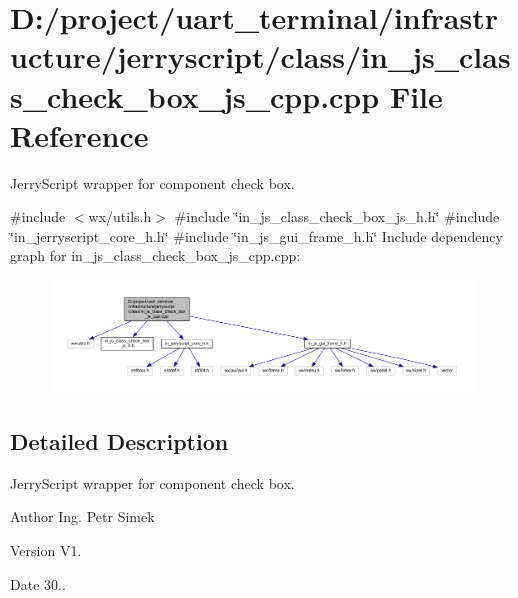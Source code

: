 \section{D\+:/project/uart\+\_\+terminal/infrastructure/jerryscript/class/in\+\_\+js\+\_\+class\+\_\+check\+\_\+box\+\_\+js\+\_\+cpp.cpp File Reference}
\label{in__js__class__check__box__js__cpp_8cpp}


Jerry\+Script wrapper for component check box.  


{\ttfamily \#include $<$wx/utils.\+h$>$}\newline
{\ttfamily \#include \char`\"{}in\+\_\+js\+\_\+class\+\_\+check\+\_\+box\+\_\+js\+\_\+h.\+h\char`\"{}}\newline
{\ttfamily \#include \char`\"{}in\+\_\+jerryscript\+\_\+core\+\_\+h.\+h\char`\"{}}\newline
{\ttfamily \#include \char`\"{}in\+\_\+js\+\_\+gui\+\_\+frame\+\_\+h.\+h\char`\"{}}\newline
Include dependency graph for in\+\_\+js\+\_\+class\+\_\+check\+\_\+box\+\_\+js\+\_\+cpp.\+cpp\+:
\nopagebreak
\begin{figure}[H]
\begin{center}
\leavevmode
\includegraphics[width=350pt]{in__js__class__check__box__js__cpp_8cpp__incl}
\end{center}
\end{figure}


\subsection{Detailed Description}
Jerry\+Script wrapper for component check box. 

\begin{DoxyAuthor}{Author}
Ing. Petr Simek 
\end{DoxyAuthor}
\begin{DoxyVersion}{Version}
V1. 
\end{DoxyVersion}
\begin{DoxyDate}{Date}
30.. 
\end{DoxyDate}
